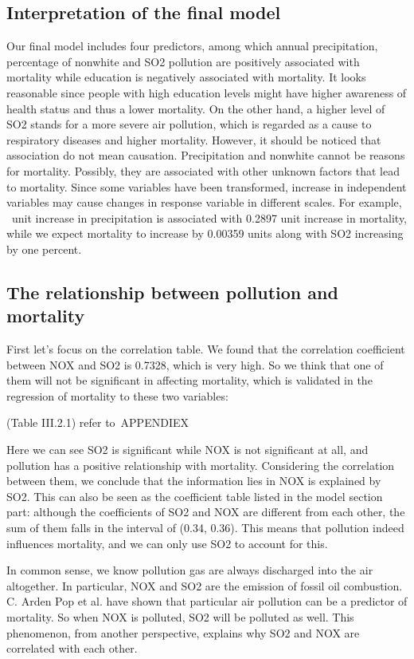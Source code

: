 \documentclass{article}
\begin{document}
  \subsection{Interpretation of the final model}
     Our final model includes four predictors, among which annual precipitation, percentage of nonwhite and SO2 pollution are positively associated with mortality while education is negatively associated with mortality. It looks reasonable since people with high education levels might have higher awareness of health status and thus a lower mortality. On the other hand, a higher level of SO2 stands for a more severe air pollution, which is regarded as a cause to respiratory diseases and higher mortality. However, it should be noticed that association do not mean causation. Precipitation and nonwhite cannot be reasons for mortality. Possibly, they are associated with other unknown factors that lead to mortality.
     Since some variables have been transformed, increase in independent variables may cause changes in response variable in different scales. For example,  unit increase in precipitation is associated with 0.2897 unit increase in mortality, while we expect mortality to increase by 0.00359 units along with SO2 increasing by one percent.

  \subsection{The relationship between pollution and mortality}

     First let's focus on the correlation table. We found that the correlation coefficient between NOX and SO2 is 0.7328, which is very high. So we think that one of them will not be significant in affecting mortality, which is validated in the regression of mortality to these two variables:

     (Table III.2.1) refer to APPENDIEX

     Here we can see SO2 is significant while NOX is not significant at all, and pollution has a positive relationship with mortality. Considering the correlation between them, we conclude that the information lies in NOX is explained by SO2. This can also be seen as the coefficient table listed in the model section part: although the coefficients of SO2 and NOX are different from each other, the sum of them falls in the interval of (0.34, 0.36). This means that pollution indeed influences mortality, and we can only use SO2 to account for this.

     In common sense, we know pollution gas are always discharged into the air altogether. In particular, NOX and SO2 are the emission of fossil oil combustion. C. Arden Pop et al. have shown that particular air pollution can be a predictor of mortality. So when NOX is polluted, SO2 will be polluted as well. This phenomenon, from another perspective, explains why SO2 and NOX are correlated with each other.
\end{document}
